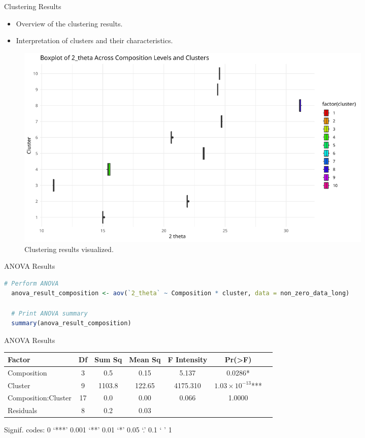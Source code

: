 \documentclass[aspectratio=169]{beamer}
\begin{document}
\begin{frame}{Clustering Results}
    \begin{itemize}
        \item Overview of the clustering results.
        \item Interpretation of clusters and their characteristics.
    \end{itemize}

    \begin{figure}
        \includegraphics[width=0.85\textwidth]{../plot/theta.png}
        \caption{Clustering results visualized.}
    \end{figure}
\end{frame}

\begin{frame}[fragile]{ANOVA Results}
  \begin{lstlisting}[language=R, basicstyle=\small\ttfamily]
  # Perform ANOVA
  anova_result_composition <- aov(`2_theta` ~ Composition * cluster, data = non_zero_data_long)
  
  # Print ANOVA summary
  summary(anova_result_composition)
  \end{lstlisting}
\end{frame}


\begin{frame}{ANOVA Results}
  \begin{table}[]
    \centering
    \begin{tabular}{lcccccc}
      \hline
      \textbf{Factor} & \textbf{Df} & \textbf{Sum Sq} & \textbf{Mean Sq} & \textbf{F Intensity} & \textbf{Pr(>F)} \\
      \hline
      Composition & 3 & 0.5 & 0.15 & 5.137 & 0.0286* \\
      Cluster & 9 & 1103.8 & 122.65 & 4175.310 & $1.03 \times 10^{-13}$*** \\
      Composition:Cluster & 17 & 0.0 & 0.00 & 0.066 & 1.0000 \\
      Residuals & 8 & 0.2 & 0.03 & & \\
      \hline
    \end{tabular}
  \end{table}
  Signif. codes: 0 ‘***’ 0.001 ‘**’ 0.01 ‘*’ 0.05 ‘.’ 0.1 ‘ ’ 1
\end{frame}
\end{document}
